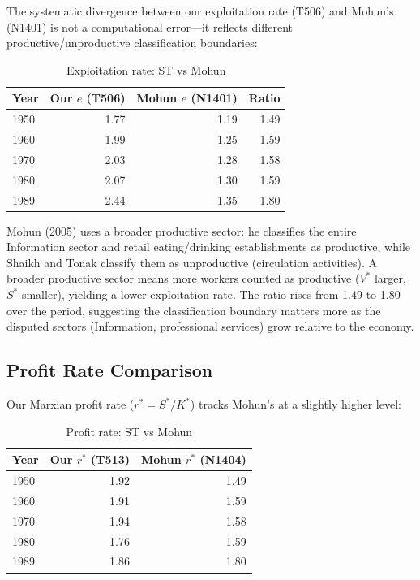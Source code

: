\documentclass[12pt,a4paper]{article}
\begin{document}
The systematic divergence between our exploitation rate (T506) and Mohun's (N1401) is not a computational error---it reflects different productive/unproductive classification boundaries:

\begin{table}[H]
\centering
\caption{Exploitation rate: ST vs Mohun}
\begin{tabular}{lrrr}
\toprule
Year & Our $e$ (T506) & Mohun $e$ (N1401) & Ratio \\
\midrule
1950 & 1.77 & 1.19 & 1.49 \\
1960 & 1.99 & 1.25 & 1.59 \\
1970 & 2.03 & 1.28 & 1.58 \\
1980 & 2.07 & 1.30 & 1.59 \\
1989 & 2.44 & 1.35 & 1.80 \\
\bottomrule
\end{tabular}
\end{table}

Mohun (2005) uses a broader productive sector: he classifies the entire Information sector and retail eating/drinking establishments as productive, while Shaikh and Tonak classify them as unproductive (circulation activities). A broader productive sector means more workers counted as productive ($V^*$ larger, $S^*$ smaller), yielding a lower exploitation rate. The ratio rises from 1.49 to 1.80 over the period, suggesting the classification boundary matters more as the disputed sectors (Information, professional services) grow relative to the economy.

\subsection{Profit Rate Comparison}

Our Marxian profit rate ($r^* = S^*/K^*$) tracks Mohun's at a slightly higher level:

\begin{table}[H]
\centering
\caption{Profit rate: ST vs Mohun}
\begin{tabular}{lrr}
\toprule
Year & Our $r^*$ (T513) & Mohun $r^*$ (N1404) \\
\midrule
1950 & 1.92 & 1.49 \\
1960 & 1.91 & 1.59 \\
1970 & 1.94 & 1.58 \\
1980 & 1.76 & 1.59 \\
1989 & 1.86 & 1.80 \\
\bottomrule
\end{tabular}
\end{table}
\end{document}
